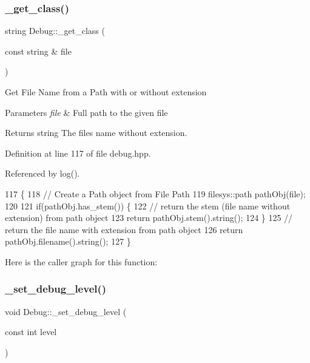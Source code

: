 \subsubsection{\texorpdfstring{\+\_\+get\+\_\+class()}{\_get\_class()}}
{\footnotesize\ttfamily string Debug\+::\+\_\+get\+\_\+class (\begin{DoxyParamCaption}\item[{const string \&}]{file }\end{DoxyParamCaption})\hspace{0.3cm}{\ttfamily [inline]}}

Get File Name from a Path with or without extension 
\begin{DoxyParams}{Parameters}
{\em file} & Full path to the given file \\
\hline
\end{DoxyParams}
\begin{DoxyReturn}{Returns}
string The file\textquotesingle{}s name without extension. 
\end{DoxyReturn}


Definition at line 117 of file debug.\+hpp.



Referenced by log().


\begin{DoxyCode}
117                                           \{
118         \textcolor{comment}{// Create a Path object from File Path}
119         filesys::path pathObj(file);
120 
121         \textcolor{keywordflow}{if}(pathObj.has\_stem()) \{
122             \textcolor{comment}{// return the stem (file name without extension) from path object}
123             \textcolor{keywordflow}{return} pathObj.stem().string();
124         \}
125         \textcolor{comment}{// return the file name with extension from path object}
126         \textcolor{keywordflow}{return} pathObj.filename().string();
127     \}
\end{DoxyCode}
Here is the caller graph for this function\+:
\mbox{\label{namespace_debug_a8195c1271782a789d8bad35b6959039c}} 
\subsubsection{\texorpdfstring{\+\_\+set\+\_\+debug\+\_\+level()}{\_set\_debug\_level()}}
{\footnotesize\ttfamily void Debug\+::\+\_\+set\+\_\+debug\+\_\+level (\begin{DoxyParamCaption}\item[{const int}]{level }\end{DoxyParamCaption})\hspace{0.3cm}{\ttfamily [inline]}}

